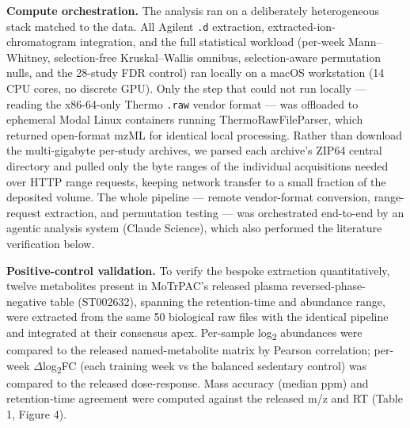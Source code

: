 \documentclass[11pt]{article}
\begin{document}
\textbf{Compute orchestration.} The analysis ran on a deliberately heterogeneous stack matched
to the data. All Agilent \texttt{.d} extraction, extracted-ion-chromatogram integration, and the
full statistical workload (per-week Mann--Whitney, selection-free Kruskal--Wallis omnibus,
selection-aware permutation nulls, and the 28-study FDR control) ran locally on a macOS
workstation (14 CPU cores, no discrete GPU). Only the step that could not run locally --- reading
the x86-64-only Thermo \texttt{.raw} vendor format --- was offloaded to ephemeral Modal Linux
containers running ThermoRawFileParser, which returned open-format mzML for identical local
processing. Rather than download the multi-gigabyte per-study archives, we parsed each archive's
ZIP64 central directory and pulled only the byte ranges of the individual acquisitions needed over
HTTP range requests, keeping network transfer to a small fraction of the deposited volume. The
whole pipeline --- remote vendor-format conversion, range-request extraction, and permutation
testing --- was orchestrated end-to-end by an agentic analysis system (Claude Science), which also
performed the literature verification below.

\textbf{Positive-control validation.} To verify the bespoke extraction quantitatively, twelve
metabolites present in MoTrPAC's released plasma reversed-phase-negative table (ST002632),
spanning the retention-time and abundance range, were extracted from the same 50
biological raw files with the identical pipeline and integrated at their consensus apex.
Per-sample log\textsubscript{2} abundances were compared to the released named-metabolite matrix by
Pearson correlation; per-week $\Delta$log\textsubscript{2}FC (each training week vs the balanced sedentary
control) was compared to the released dose-response. Mass accuracy (median ppm) and
retention-time agreement were computed against the released m/z and RT
(Table 1, Figure 4).
\end{document}
